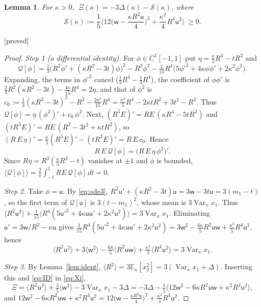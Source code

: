 \documentclass[11pt,a4paper]{article}
\newtheorem{lemma}[theorem]{Lemma}
\theoremstyle{remark}
\theoremstyle{definition}
\theoremstyle{plain}
\theoremstyle{remark}
\newcommand{\E}{\mathbb{E}}
\newcommand{\Var}{\operatorname{Var}}
\newcommand{\st}[1]{\textsf{[#1]}}
\newcommand{\fu}{\mathsf{u}}%
\newcommand{\fw}{\mathsf{w}}
\begin{document}
\begin{lemma}\label{lem:sos}
For $\kappa>0$, $\ \Xi(\kappa)=-3\Delta(\kappa)-\mathcal S(\kappa)$, where
\begin{equation}\label{eq:S}
\mathcal S(\kappa):=\frac15\Big\langle12\Big(\fw-\frac{\kappa R^2\fu}{4}\Big)^2+\frac{\kappa^2}4R^4\fu^2\Big\rangle\ \ge0 .
\end{equation}
\end{lemma}
\noindent\st{proved}
\begin{proof}
\emph{Step 1 (a differential identity).} For $\phi\in C^1[-1,1]$ put $\eta=\frac\kappa5R^4-tR^2$ and
\[
\mathcal Q[\phi]=\tfrac13\big(R^2\phi'+(\kappa R^2-3t)\phi\big)^2-R^2\phi^2-\tfrac1{15}R^4\big(5\phi'^2+4\kappa\phi\phi'+2\kappa^2\phi^2\big).
\]
Expanding, the terms in $\phi'^2$ cancel ($\frac13R^4-\frac13R^4$), the coefficient of $\phi\phi'$ is
$\frac23R^2(\kappa R^2-3t)-\frac{4\kappa}{15}R^4=2\eta$, and that of $\phi^2$ is
$c_0:=\frac13(\kappa R^2-3t)^2-R^2-\frac{2\kappa^2}{15}R^4=\frac{\kappa^2}5R^4-2\kappa tR^2+3t^2-R^2$. Thus
$\mathcal Q[\phi]=\eta\,(\phi^2)'+c_0\,\phi^2$. Next, $(R^5E)'=RE\,(\kappa R^4-5tR^2)$ and $(tR^3E)'=RE\,(R^2-3t^2+\kappa tR^2)$, so
$(R\,E\,\eta)'=\frac\kappa5(R^5E)'-(tR^3E)'=R\,E\,c_0$. Hence
\[
R\,E\,\mathcal Q[\phi]=\big(R\,E\,\eta\,\phi^2\big)' .
\]
Since $R\eta=R^3(\frac\kappa5R^2-t)$ vanishes at $\pm1$ and $\phi$ is bounded, $\langle\mathcal Q[\phi]\rangle=\frac2\pi\int_{-1}^1RE\,\mathcal Q[\phi]\,dt=0$.

\emph{Step 2.} Take $\phi=\fu$. By \eqref{eq:ode3}, $R^2\fu'+(\kappa R^2-3t)\fu=3\fw-3t\fu=3(m_1-t)$, so the first term of $\mathcal Q[\fu]$
is $3(t-m_1)^2$, whose mean is $3\Var_\kappa x_1$. Thus
$\langle R^2\fu^2\rangle+\frac1{15}\langle R^4(5\fu'^2+4\kappa\fu\fu'+2\kappa^2\fu^2)\rangle=3\Var_\kappa x_1$. Eliminating
$\fu'=3\fw/R^2-\kappa\fu$ gives
$\frac1{15}R^4(5\fu'^2+4\kappa\fu\fu'+2\kappa^2\fu^2)=3\fw^2-\frac{6\kappa}5R^2\fu\fw+\frac{\kappa^2}5R^4\fu^2$, hence
\begin{equation}\label{eq:ID}
\langle R^2\fu^2\rangle+3\langle\fw^2\rangle-\tfrac{6\kappa}5\langle R^2\fu\fw\rangle+\tfrac{\kappa^2}5\langle R^4\fu^2\rangle=3\Var_\kappa x_1 .
\end{equation}

\emph{Step 3.} By Lemma~\ref{lem:ident}, $\langle R^2\rangle=3\E_\kappa[x_2^2]=3(\Var_\kappa x_1+\Delta)$. Inserting this and \eqref{eq:ID} in
\eqref{eq:Xi},
\[
\Xi=\langle R^2\fu^2\rangle+\tfrac35\langle\fw^2\rangle-3\Var_\kappa x_1-3\Delta=-3\Delta-\tfrac15\big\langle12\fw^2-6\kappa R^2\fu\fw+\kappa^2R^4\fu^2\big\rangle,
\]
and $12\fw^2-6\kappa R^2\fu\fw+\kappa^2R^4\fu^2=12\big(\fw-\frac{\kappa R^2\fu}4\big)^2+\frac{\kappa^2}4R^4\fu^2$.
\end{proof}
\end{document}
